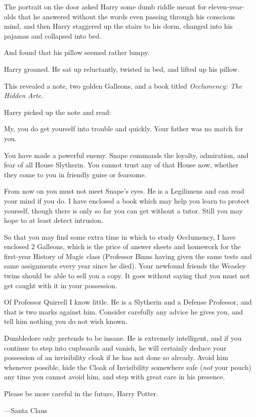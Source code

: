 The portrait on the door asked Harry some dumb riddle meant for eleven-year-olds that he answered without the words even passing through his conscious mind, and then Harry staggered up the stairs to his dorm, changed into his pajamas and collapsed into bed.

And found that his pillow seemed rather lumpy.

Harry groaned. He sat up reluctantly, twisted in bed, and lifted up his pillow.

This revealed a note, two golden Galleons, and a book titled \emph{Occlumency: The Hidden Arte.}

Harry picked up the note and read:

\begin{writtenNote}
My, you do get yourself into trouble and quickly. Your father was no match for you.

You have made a powerful enemy. Snape commands the loyalty, admiration, and fear of all House Slytherin. You cannot trust any of that House now, whether they come to you in friendly guise or fearsome.

From now on you must not meet Snape's eyes. He is a Legilimens and can read your mind if you do. I have enclosed a book which may help you learn to protect yourself, though there is only so far you can get without a tutor. Still you may hope to at least detect intrusion.

So that you may find some extra time in which to study Occlumency, I have enclosed 2 Galleons, which is the price of answer sheets and homework for the first-year History of Magic class (Professor Binns having given the same tests and same assignments every year since he died). Your newfound friends the Weasley twins should be able to sell you a copy. It goes without saying that you must not get caught with it in your possession.

Of Professor Quirrell I know little. He is a Slytherin and a Defense Professor, and that is two marks against him. Consider carefully any advice he gives you, and tell him nothing you do not wish known.

Dumbledore only pretends to be insane. He is extremely intelligent, and if you continue to step into cupboards and vanish, he will certainly deduce your possession of an invisibility cloak if he has not done so already. Avoid him whenever possible, hide the Cloak of Invisibility somewhere safe (\emph{not} your pouch) any time you cannot avoid him, and step with great care in his presence.

Please be more careful in the future, Harry Potter.

—Santa Claus
\end{writtenNote}

